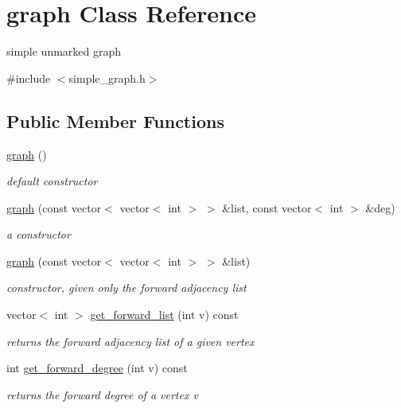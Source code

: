 \hypertarget{classgraph}{}\section{graph Class Reference}
\label{classgraph}


simple unmarked graph  




{\ttfamily \#include $<$simple\+\_\+graph.\+h$>$}

\subsection*{Public Member Functions}
\begin{DoxyCompactItemize}
\item 
\hyperlink{classgraph_a6aaa56b4528d2fdb8f0ecd97e04f6651}{graph} ()
\begin{DoxyCompactList}\small\item\em default constructor \end{DoxyCompactList}\item 
\hyperlink{classgraph_aa3c320d16aa30fd79690d4acac3371cb}{graph} (const vector$<$ vector$<$ int $>$ $>$ \&list, const vector$<$ int $>$ \&deg)
\begin{DoxyCompactList}\small\item\em a constructor \end{DoxyCompactList}\item 
\hyperlink{classgraph_aa3102f160759896897b1eb3665f2ac13}{graph} (const vector$<$ vector$<$ int $>$ $>$ \&list)
\begin{DoxyCompactList}\small\item\em constructor, given only the forward adjacency list \end{DoxyCompactList}\item 
vector$<$ int $>$ \hyperlink{classgraph_aa8fbee52a7b3604dbbd9175040c7ead5}{get\+\_\+forward\+\_\+list} (int v) const
\begin{DoxyCompactList}\small\item\em returns the forward adjacency list of a given vertex \end{DoxyCompactList}\item 
int \hyperlink{classgraph_a388b6ce292a4c49e3853e22bdce978de}{get\+\_\+forward\+\_\+degree} (int v) const
\begin{DoxyCompactList}\small\item\em returns the forward degree of a vertex v \end{DoxyCompactList}\item 

\end{DoxyCompactItemize}
